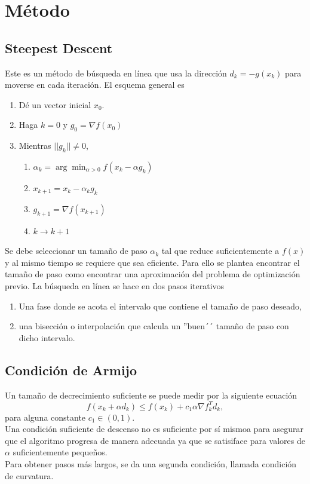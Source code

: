 \documentclass[11pt,letterpaper]{article}
\theoremstyle{definition}
\theoremstyle{definition}
\theoremstyle{definition}
\begin{document}
\section{Método}
\subsection{Steepest Descent}
Este es un método de búsqueda en línea que usa la dirección $ d_k = - g(x_k) $ para moverse en cada iteración. El esquema general es
\begin{enumerate}
	\item Dé un vector inicial $ x_0 $.
	\item Haga $ k = 0 $ y $ g_0 = \nabla f(x_0) $
	\item Mientras $ || g_k || \neq 0 $, 
			\begin{enumerate}
				\item $ \alpha_k = \displaystyle\arg \min_{\alpha >0} f(x_k - \alpha g_k) $
				\item $ x_{k+1} = x_k - \alpha_k g_k $
				\item $ g_{k+1} = \nabla f (x_{k+1}) $
				\item $ k \to k + 1 $
			\end{enumerate}
\end{enumerate}
Se debe seleccionar un tamaño de paso $ \alpha_k $ tal que reduce suficientemente a $ f(x) $ y al mismo tiempo se requiere que sea eficiente. Para ello se plantea encontrar el tamaño de paso como encontrar una aproximación del problema de optimización previo. La búsqueda en línea se hace en dos pasos iterativos
\begin{shaded*}
	\begin{enumerate}
		\item Una fase donde se acota el intervalo que contiene el tamaño de paso deseado,
		\item una bisección o interpolación que calcula un ''buen´´ tamaño de paso con dicho intervalo.
	\end{enumerate}
\end{shaded*}
\subsection{Condición de Armijo}
Un tamaño de decrecimiento suficiente se puede medir por la siguiente ecuación
\[  f(x_k + \alpha d_k) \leq f(x_k) + c_1 \alpha \nabla f_k^T d_k, \]
para alguna constante $ c_1 \in (0,1) $.
\\
Una condición suficiente de descenso no es suficiente por sí mismoa para asegurar que el algoritmo progresa de manera adecuada ya que se satisiface para valores de $ \alpha $ suficientemente pequeños.
\\
Para obtener pasos más largos, se da una segunda condición, llamada condición de curvatura. 
\end{document}
